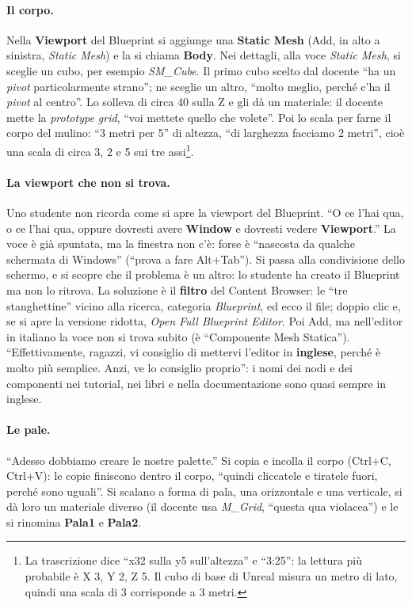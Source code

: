 \paragraph{Il corpo.} Nella \textbf{Viewport} del Blueprint si aggiunge una
\textbf{Static Mesh} (Add, in alto a sinistra, \emph{Static Mesh}) e la si chiama
\textbf{Body}. Nei dettagli, alla voce \emph{Static Mesh}, si sceglie un cubo, per
esempio \emph{SM\_Cube}. Il primo cubo scelto dal docente ``ha un \emph{pivot}
particolarmente strano''; ne sceglie un altro, ``molto meglio, perché c'ha il
\emph{pivot} al centro''. Lo solleva di circa 40 sulla Z e gli dà un materiale: il
docente mette la \emph{prototype grid}, ``voi mettete quello che volete''. Poi lo scala
per farne il corpo del mulino: ``3 metri per 5'' di altezza, ``di larghezza facciamo 2
metri'', cioè una scala di circa 3, 2 e 5 sui tre assi\footnote{La trascrizione dice
``x32 sulla y5 sull'altezza'' e ``3:25'': la lettura più probabile è X 3, Y 2, Z 5. Il
cubo di base di Unreal misura un metro di lato, quindi una scala di 3 corrisponde a 3
metri.}.

\paragraph{La viewport che non si trova.} Uno studente non ricorda come si apre la
viewport del Blueprint. ``O ce l'hai qua, o ce l'hai qua, oppure dovresti avere
\textbf{Window} e dovresti vedere \textbf{Viewport}.'' La voce è già spuntata, ma la
finestra non c'è: forse è ``nascosta da qualche schermata di Windows'' (``prova a fare
Alt+Tab''). Si passa alla condivisione dello schermo, e si scopre che il problema è un
altro: lo studente ha creato il Blueprint ma non lo ritrova. La soluzione è il
\textbf{filtro} del Content Browser: le ``tre stanghettine'' vicino alla ricerca,
categoria \emph{Blueprint}, ed ecco il file; doppio clic e, se si apre la versione
ridotta, \emph{Open Full Blueprint Editor}. Poi Add, ma nell'editor in italiano la voce
non si trova subito (è ``Componente Mesh Statica''). ``Effettivamente, ragazzi, vi
consiglio di mettervi l'editor in \textbf{inglese}, perché è molto più semplice. Anzi,
ve lo consiglio proprio'': i nomi dei nodi e dei componenti nei tutorial, nei libri e
nella documentazione sono quasi sempre in inglese.

\paragraph{Le pale.} ``Adesso dobbiamo creare le nostre palette.'' Si copia e incolla il
corpo (Ctrl+C, Ctrl+V): le copie finiscono dentro il corpo, ``quindi cliccatele e
tiratele fuori, perché sono uguali''. Si scalano a forma di pala, una orizzontale e una
verticale, si dà loro un materiale diverso (il docente usa \emph{M\_Grid}, ``questa
qua violacea'') e le si rinomina \textbf{Pala1} e \textbf{Pala2}.


